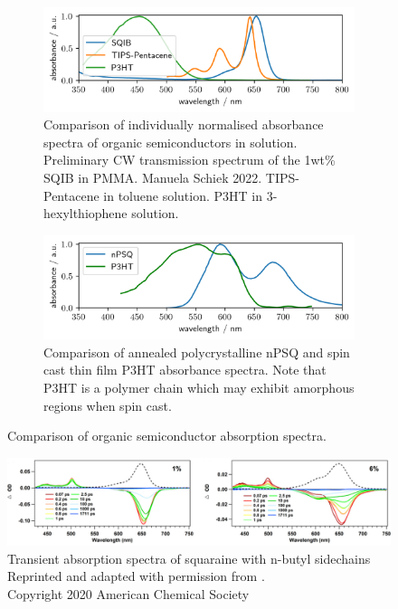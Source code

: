 \documentclass[twoside,openright]{scrreprt}
\begin{document}
\begin{figure}[hbtp]
\centering
\begin{subfigure}[b]{\textwidth}
\includegraphics[width = \textwidth]{images/spectra/OSC/ComparisonOfOSCSolution.png}
\caption{Comparison of individually normalised absorbance spectra of organic semiconductors in solution. Preliminary CW transmission spectrum of the 1wt\% SQIB in PMMA. Manuela Schiek 2022. TIPS-Pentacene in toluene solution.\cite{Schaberle2020} P3HT in 3-hexylthiophene solution\cite{Rahimi2014}.}
\end{subfigure}
\begin{subfigure}[b]{\textwidth}
\includegraphics[width = \textwidth]{images/spectra/OSC/ComparisonOfOSCCrystal.png}
\caption{Comparison of annealed polycrystalline nPSQ\cite{Balzer2022} and spin cast thin film P3HT absorbance spectra. Note that P3HT is a polymer chain which may exhibit amorphous regions when spin cast.\cite{Rahimi2014}\label{fig:crystOSC}}
\end{subfigure}
\caption{Comparison of organic semiconductor absorption spectra.\label{fig:compOSC}}
\end{figure}

\begin{figure}[hbtp]
\centering
\includegraphics[scale=1.2]{images/Zheng2020SquaraineTAgraphCut.jpeg}
\caption{Transient absorption spectra of squaraine with n-butyl sidechains\\
Reprinted and adapted with permission from \protect{}. \\Copyright 2020 American Chemical Society\label{fig:zhengTA}}
\end{figure}
\end{document}
